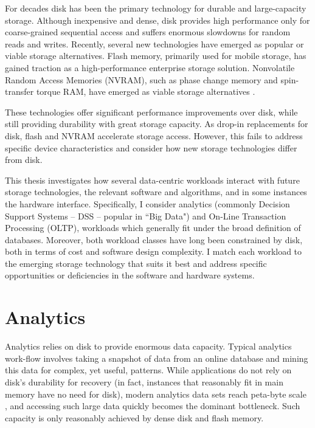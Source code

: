 For decades disk has been the primary technology for durable and large-capacity storage.
Although inexpensive and dense, disk provides high performance only for coarse-grained sequential access and suffers enormous slowdowns for random reads and writes.
Recently, several new technologies have emerged as popular or viable storage alternatives.
Flash memory, primarily used for mobile storage, has gained traction as a high-performance enterprise storage solution.
Nonvolatile Random Access Memories (NVRAM), such as phase change memory and spin-transfer torque RAM, have emerged as viable storage alternatives \cite{BurrKurdi08}.

These technologies offer significant performance improvements over disk, while still providing durability with great storage capacity.
As drop-in replacements for disk, flash and NVRAM accelerate storage access.
However, this fails to address specific device characteristics and consider how new storage technologies differ from disk.

This thesis investigates how several data-centric workloads interact with future storage technologies, the relevant software and algorithms, and in some instances the hardware interface.
Specifically, I consider analytics (commonly Decision Support Systems -- DSS -- popular in ``Big Data") and On-Line Transaction Processing (OLTP), workloads which generally fit under the broad definition of databases.
Moreover, both workload classes have long been constrained by disk, both in terms of cost and software design complexity.
I match each workload to the emerging storage technology that suits it best and address specific opportunities or deficiencies in the software and hardware systems.

\section{Analytics}
\label{sec:Intro:Analytics}

Analytics relies on disk to provide enormous data capacity.
Typical analytics work-flow involves taking a snapshot of data from an online database and mining this data for complex, yet useful, patterns.
While applications do not rely on disk's durability for recovery (in fact, instances that reasonably fit in main memory have no need for disk), modern analytics data sets reach peta-byte scale \cite{Economist10}, and accessing such large data quickly becomes the dominant bottleneck.
Such capacity is only reasonably achieved by dense disk and flash memory.


